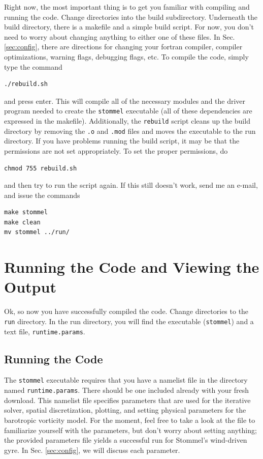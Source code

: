 \documentclass{softwaremanual}
\begin{document}
Right now, the most important thing is to get you familiar with compiling and running the code. Change directories into the build subdirectory. Underneath the build directory, there is a makefile and a simple build script. For now, you don't need to worry about changing anything to either one of these files. In Sec. \ref{sec:config}, there are directions for changing your fortran compiler, compiler optimizations, warning flags, debugging flags, etc. To compile the code, simply type the command
\begin{verbatim}
./rebuild.sh
\end{verbatim}
and press enter. This will compile all of the necessary modules and the driver program needed to create the \texttt{stommel} executable (all of these dependencies are expressed in the makefile). Additionally, the \texttt{rebuild} script cleans up the build directory by removing the \texttt{.o} and \texttt{.mod} files and moves the executable to the run directory. If you have problems running the build script, it may be that the permissions are not set appropriately. To set the proper permissions, do
\begin{verbatim}
chmod 755 rebuild.sh
\end{verbatim}
and then try to run the script again. If this still doesn't work, send me an e-mail, and issue the commands
\begin{verbatim}
make stommel
make clean
mv stommel ../run/
\end{verbatim}

\section{Running the Code and Viewing the Output}
Ok, so now you have successfully compiled the code. Change directories to the \texttt{run} directory. In the run directory, you will find the executable (\texttt{stommel}) and a text file, \texttt{runtime.params}.

\subsection{Running the Code}
The \texttt{stommel} executable requires that you have a namelist file in the directory named \texttt{runtime.params}. There should be one included already with your fresh download. This namelist file specifies parameters that are used for the iterative solver, spatial discretization, plotting, and setting physical parameters for the barotropic vorticity model. For the moment, feel free to take a look at the file to familiarize yourself with the parameters, but don't worry about setting anything; the provided parameters file yields a successful run for Stommel's wind-driven gyre. In Sec. \ref{sec:config}, we will discuss each parameter.
\end{document}
